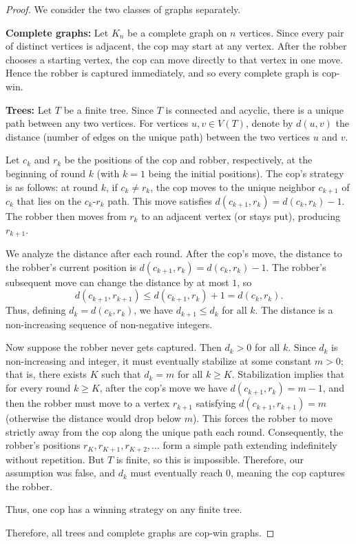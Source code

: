 \documentclass[12pt, a4paper]{article}
\begin{document}
\begin{proof}
We consider the two classes of graphs separately.

\textbf{Complete graphs:}  
Let $K_n$ be a complete graph on $n$ vertices. Since every pair of distinct vertices is adjacent, the cop may start at any vertex. After the robber chooses a starting vertex, the cop can move directly to that vertex in one move. Hence the robber is captured immediately, and so every complete graph is cop-win.

\textbf{Trees:}  
Let $T$ be a finite tree. Since $T$ is connected and acyclic, there is a unique path between any two vertices. For vertices $u,v \in V(T)$, denote by $d(u,v)$ the distance (number of edges on the unique path) between the two vertices $u$ and $v$.

Let $c_k$ and $r_k$ be the positions of the cop and robber, respectively, at the beginning of round $k$ (with $k=1$ being the initial positions). The cop's strategy is as follows: at round $k$, if $c_k \neq r_k$, the cop moves to the unique neighbor $c_{k+1}$ of $c_k$ that lies on the $c_k$-$r_k$ path. This move satisfies $d(c_{k+1}, r_k) = d(c_k, r_k) - 1$. The robber then moves from $r_k$ to an adjacent vertex (or stays put), producing $r_{k+1}$.

We analyze the distance after each round. After the cop's move, the distance to the robber's current position is $d(c_{k+1}, r_k) = d(c_k, r_k) - 1$. The robber's subsequent move can change the distance by at most $1$, so
\[
d(c_{k+1}, r_{k+1}) \le d(c_{k+1}, r_k) + 1 = d(c_k, r_k).
\]
Thus, defining $d_k = d(c_k, r_k)$, we have $d_{k+1} \le d_k$ for all $k$. The distance is a non-increasing sequence of non-negative integers.

Now suppose the robber never gets captured. Then $d_k > 0$ for all $k$. Since $d_k$ is non-increasing and integer, it must eventually stabilize at some constant $m > 0$; that is, there exists $K$ such that $d_k = m$ for all $k \ge K$. Stabilization implies that for every round $k \ge K$, after the cop's move we have $d(c_{k+1}, r_k) = m-1$, and then the robber must move to a vertex $r_{k+1}$ satisfying $d(c_{k+1}, r_{k+1}) = m$ (otherwise the distance would drop below $m$). This forces the robber to move strictly away from the cop along the unique path each round. Consequently, the robber's positions $r_K, r_{K+1}, r_{K+2}, \dots$ form a simple path extending indefinitely without repetition. But $T$ is finite, so this is impossible. Therefore, our assumption was false, and $d_k$ must eventually reach $0$, meaning the cop captures the robber.

Thus, one cop has a winning strategy on any finite tree.

Therefore, all trees and complete graphs are cop-win graphs.
\end{proof}
\end{document}
